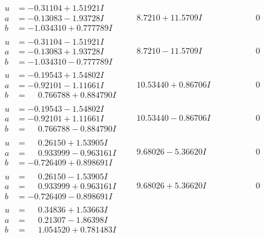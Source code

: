 \documentclass[1p]{elsarticle_modified}
\theoremstyle{definition}
\begin{document}
$$\begin{array}{c|c|c}
\begin{aligned}
u &= -0.31104 + 1.51921 I \\
a &= -0.13083 - 1.93728 I \\
b &= -1.034310 + 0.777789 I\end{aligned}
 & \phantom{-}8.7210 + 11.5709 I & \phantom{-0.000000 } 0 \\ \hline\begin{aligned}
u &= -0.31104 - 1.51921 I \\
a &= -0.13083 + 1.93728 I \\
b &= -1.034310 - 0.777789 I\end{aligned}
 & \phantom{-}8.7210 - 11.5709 I & \phantom{-0.000000 } 0 \\ \hline\begin{aligned}
u &= -0.19543 + 1.54802 I \\
a &= -0.92101 - 1.11661 I \\
b &= \phantom{-}0.766788 + 0.884790 I\end{aligned}
 & \phantom{-}10.53440 + 0.86706 I & \phantom{-0.000000 } 0 \\ \hline\begin{aligned}
u &= -0.19543 - 1.54802 I \\
a &= -0.92101 + 1.11661 I \\
b &= \phantom{-}0.766788 - 0.884790 I\end{aligned}
 & \phantom{-}10.53440 - 0.86706 I & \phantom{-0.000000 } 0 \\ \hline\begin{aligned}
u &= \phantom{-}0.26150 + 1.53905 I \\
a &= \phantom{-}0.933999 - 0.963161 I \\
b &= -0.726409 + 0.898691 I\end{aligned}
 & \phantom{-}9.68026 - 5.36620 I & \phantom{-0.000000 } 0 \\ \hline\begin{aligned}
u &= \phantom{-}0.26150 - 1.53905 I \\
a &= \phantom{-}0.933999 + 0.963161 I \\
b &= -0.726409 - 0.898691 I\end{aligned}
 & \phantom{-}9.68026 + 5.36620 I & \phantom{-0.000000 } 0 \\ \hline\begin{aligned}
u &= \phantom{-}0.34836 + 1.53663 I \\
a &= \phantom{-}0.21307 - 1.86398 I \\
b &= \phantom{-}1.054520 + 0.781483 I\end{aligned}

\end{array}$$
\end{document}
